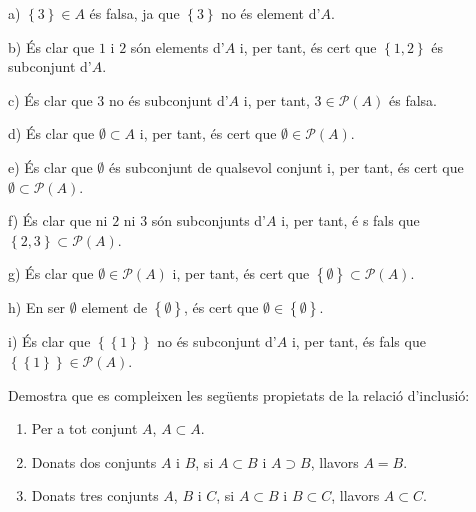 \begin{solucio}
a) $\left\{ 3\right\} \in A$ \'{e}s falsa, ja que $\left\{ 3\right\} $ no
\'{e}s element d'$A$.

b) \'{E}s clar que $1$ i $2$ s\'{o}n elements d'$A$ i, per tant, \'{e}s cert
que $\left\{ 1,2\right\} $ \'{e}s subconjunt d'$A$.

c) \'{E}s clar que $3$ no \'{e}s subconjunt d'$A$ i, per tant, $3\in
\mathcal{P}(A)$ \'{e}s falsa.

d) \'{E}s clar que $\emptyset \subset A$ i, per tant, \'{e}s cert que $%
\emptyset \in \mathcal{P}(A)$.

e) \'{E}s clar que $\emptyset $ \'{e}s subconjunt de qualsevol conjunt i,
per tant, \'{e}s cert que $\emptyset \subset \mathcal{P}(A)$.

f) \'{E}s clar que ni $2$ ni $3$ s\'{o}n subconjunts d'$A$ i, per tant, \'{e}%
s fals que $\left\{ 2,3\right\} \subset \mathcal{P}(A)$.

g) \'{E}s clar que $\emptyset \in \mathcal{P}(A)$ i, per tant, \'{e}s cert
que $\left\{ \emptyset \right\} \subset \mathcal{P}(A)$.

h) En ser $\emptyset $ element de $\left\{ \emptyset \right\} $, \'{e}s cert
que $\emptyset \in \left\{ \emptyset \right\} $.

i) \'{E}s clar que $\left\{ \left\{ 1\right\} \right\} $ no \'{e}s
subconjunt d'$A$ i, per tant, \'{e}s fals que $\left\{ \left\{ 1\right\}
\right\} \in \mathcal{P}(A)$.
\end{solucio}

\begin{exercici}
Demostra que es compleixen les seg\"{u}ents propietats de la relaci\'{o}
d'inclusi\'{o}:

\begin{enumerate}
\item Per a tot conjunt $A$, $A\subset A$.

\item Donats dos conjunts $A$ i $B$, si $A\subset B$ i $A\supset B$, llavors
$A=B$.

\item Donats tres conjunts $A$, $B$ i $C$, si $A\subset B$ i $B\subset C$,
llavors $A\subset C$.
\end{enumerate}
\end{exercici}

